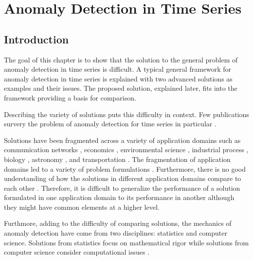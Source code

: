 \chapter[adts]{Anomaly Detection in Time Series}

\section[adintro]{Introduction}

The goal of this chapter is to show that the solution to the general problem of anomaly detection in time series is difficult. A typical general framework for anomaly detection in time series is explained with two advanced solutions as examples and their issues. The proposed solution, explained later, fits into the framework providing a basis for comparison.

Describing the variety of solutions puts this difficulty in context. Few publications survery the problem of anomaly detection for time series in particular \cite{Cheboli2010} \cite{Gupta2013}.

Solutions have been fragmented across a variety of application domains such as communication networks \cite{Jiang2006, Szymanski2004, Ye2000, Portnoy2001, Zhen2006, Warrender1999, Angiulli2007, Lane1999, Lane1997, Hofmeyr1998, Sequeira2002}, economics \cite{gupta2012community, Otey2006, Zhu2003}, environmental science \cite{Hill2010, Hill2010a, Angiulli2007, Birant2006, Cheng2006, Yuxiang2005, Wu2010, Drosdowsky1993, Lasaponara2006, Lu2004}, industrial process \cite{Basu2007, Nairac1999, Dasgupta1996, Bu2007}, biology \cite{Keogh2005, Wei2006}, astronomy \cite{Keogh2005, Yankov2008}, and transportation \cite{Li2009,Ge2010}. The fragmentation of application domains led to a variety of problem formulations \cite{Gupta2013}. Furthermore, there is no good understanding of how the solutions in different application domains compare to each other \cite{Cheboli2010}. Therefore, it is difficult to generalize the performance of a solution formulated in one application domain to its performance in another although they might have common elements at a higher level.

Furthmore, adding to the difficulty of comparing solutions, the mechanics of anomaly detection have come from two disciplines: statistics and computer science. Solutions from statistics focus on mathematical rigor while solutions from computer science consider computational issues \cite{Gupta2013}.

